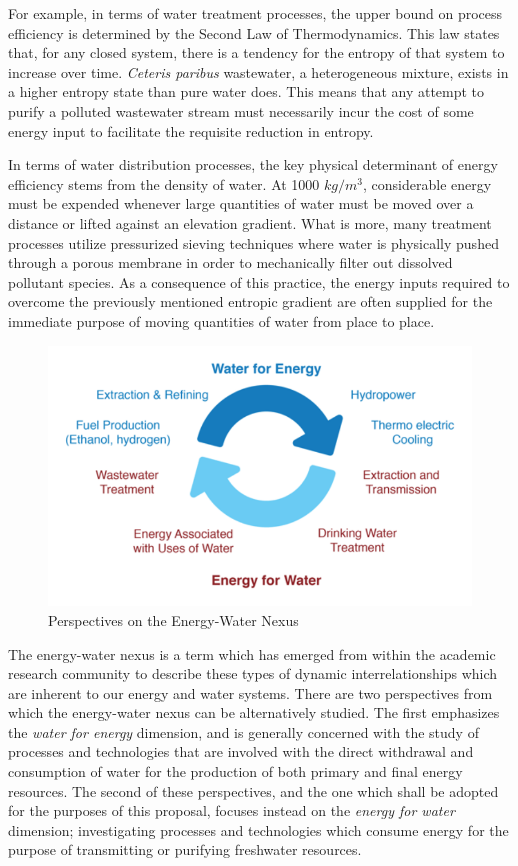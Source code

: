     For example, in terms of water treatment processes, the upper bound on process efficiency is determined by the Second Law of Thermodynamics. This law states that, for any closed system, there is a tendency for the entropy of that system to increase over time. \textit{Ceteris paribus} wastewater, a heterogeneous mixture, exists in a higher entropy state than pure water does. This means that any attempt to purify a polluted wastewater stream must necessarily incur the cost of some energy input to facilitate the requisite reduction in entropy. 
    
    In terms of water distribution processes, the key physical determinant of energy efficiency stems from the density of water. At 1000 $kg/m^3$, considerable energy must be expended whenever large quantities of water must be moved over a distance or lifted against an elevation gradient. What is more, many treatment processes utilize pressurized sieving techniques where water is physically pushed through a porous membrane in order to mechanically filter out dissolved pollutant species. As a consequence of this practice, the energy inputs required to overcome the previously mentioned entropic gradient are often supplied for the immediate purpose of moving quantities of water from place to place.
    
     \begin{figure}[Perspectives on the Energy-Water Nexus]
       \centering
       \includegraphics[width=4.5in]{figures/energy-water-nexus-perspectives.png}
       \caption[Perspectives on the Energy-Water Nexus]{Perspectives on the Energy-Water Nexus}
       \label{fig:energy-water-perspectives}
     \end{figure}
     
    The energy-water nexus is a term which has emerged from within the academic research community to describe these types of dynamic interrelationships which are inherent to our energy and water systems. There are two perspectives from which the energy-water nexus can be alternatively studied. The first emphasizes the \textit{water for energy} dimension, and is generally concerned with the study of processes and technologies that are involved with the direct withdrawal and consumption of water for the production of both primary and final energy resources. The second of these perspectives, and the one which shall be adopted for the purposes of this proposal, focuses instead on the \textit{energy for water} dimension; investigating processes and technologies which consume energy for the purpose of transmitting or purifying freshwater resources. 
    
